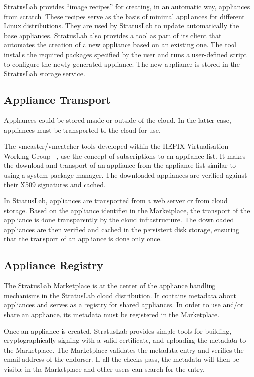 StratusLab provides ``image recipes'' for creating, in an automatic way, appliances from scratch. 
These recipes serve as the basis of minimal appliances for different
Linux distributions. They are used by StratusLab to update automatically
the base appliances. StratusLab also provides a tool as part of its client that 
automates the creation of a new appliance based on an existing one.
The tool installs the required packages specified by the user and runs a user-defined  
script to configure the newly generated appliance.
The new appliance is stored in the StratusLab storage service.

\subsection{Appliance Transport}

Appliances could be stored inside or outside of the cloud. In the latter case, 
appliances must be transported to the cloud for use.

The vmcaster/vmcatcher tools developed within the HEPIX Virtualisation Working
Group ~\cite{hepixbooktransfer}, use the concept of subscriptions to an 
appliance list. It makes the download and transport of an appliance 
from the appliance list similar to using a system package manager.
The downloaded appliances are
verified against their X509 signatures and cached.

In StratusLab, appliances are transported from a web
server or from cloud storage. Based on the appliance identifier in the Marketplace,
the transport of the appliance is done transparently by the cloud infrastructure.
The downloaded appliances are then verified and cached in the persistent disk storage,
ensuring that the transport of an appliance is done only once.

\subsection{Appliance Registry}

The StratusLab Marketplace is at the center of the appliance handling
mechanisms in the StratusLab cloud distribution. It contains metadata 
about appliances and serves as a registry for shared appliances. 
In order to use and/or share an appliance, its metadata must be registered 
in the Marketplace\@. 

Once an appliance is created, StratusLab provides simple tools for 
building, cryptographically signing with a valid
certificate, and uploading the metadata to the Marketplace\@.  The Marketplace
validates the metadata entry and verifies the 
email address of the endorser.  If all the checks pass, 
the metadata will then be visible in the Marketplace and other users 
can search for the entry.
